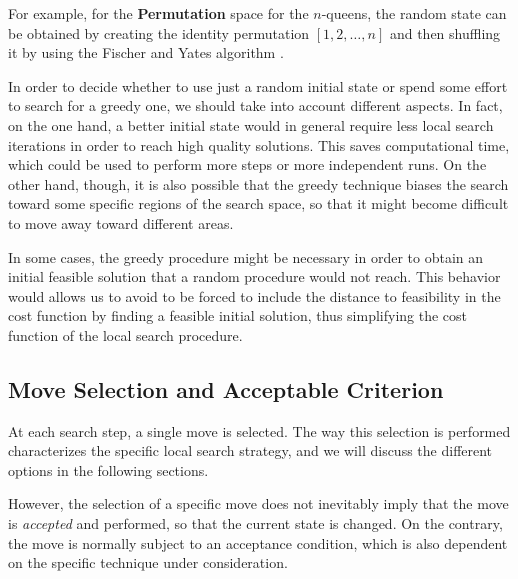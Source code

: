 For example, for the \textbf{Permutation} space for the $n$-queens, the
random state can be obtained by creating the identity permutation
$[1,2,\dots,n]$ and then shuffling it by using the Fischer
and Yates algorithm \cite{FiYa38}.


In order to decide whether to use just a random initial state or spend
some effort to search for a greedy one, we should take into account
different aspects. In fact, on the one hand, a better initial state
would in general require less local search iterations in order to reach
high quality solutions. This saves computational time, which could be used
to perform more steps or more independent runs. On the other hand,
though, it is also possible that the greedy technique biases the
search toward some specific regions of the search space, so that it
might become difficult to move away toward different areas.

In some cases, the greedy procedure might be necessary in order to
obtain an initial feasible solution that a random procedure would not
reach. This behavior would allows us to avoid to be forced to include
the distance to feasibility in the cost function by finding a feasible
initial solution, thus simplifying the cost function of the local
search procedure.




\subsection{Move Selection and Acceptable Criterion}

At each search step, a single move is selected. The way this selection is
performed characterizes the specific local search strategy, and we
will discuss the different options in the following sections.

However, the selection of a specific move does not inevitably imply that
the move is \emph{accepted} and performed, so that the current state is changed. On
the contrary, the move is normally subject to an acceptance condition,
which is also dependent on the specific technique under consideration.

